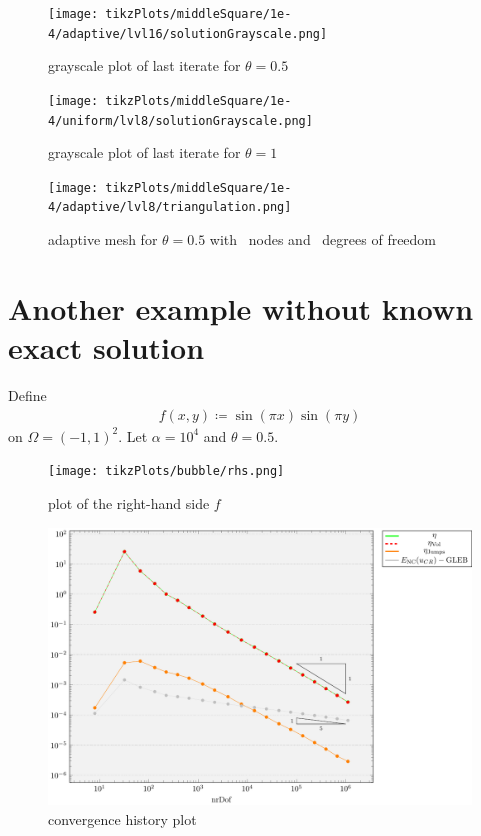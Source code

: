 \documentclass[draft=false,twoside,12pt]{scrreprt}
\begin{document}
\begin{minipage}[t]{0.5\textwidth}
  \begin{figure}[H]
	  \centering
		\texttt{[image: tikzPlots/middleSquare/1e-4/adaptive/lvl16/solutionGrayscale.png]}
    \caption{grayscale plot of last iterate for $\theta = 0.5$}
  \end{figure}
\end{minipage}
\begin{minipage}[t]{0.5\textwidth}
  \begin{figure}[H]
	  \centering
		\texttt{[image: tikzPlots/middleSquare/1e-4/uniform/lvl8/solutionGrayscale.png]}
    \caption{grayscale plot of last iterate for $\theta = 1$}
  \end{figure}
\end{minipage}


\begin{figure}[H]
	\centering
  \texttt{[image: tikzPlots/middleSquare/1e-4/adaptive/lvl8/triangulation.png]}
  \caption{adaptive mesh for $\theta = 0.5$ with \nrNodes\ nodes and 
  \nrDof\ degrees of freedom}
\end{figure}


\section{Another example without known exact solution}
Define
\begin{align}
  \label{equ:defBubble}
  f(x, y)\coloneqq \sin(\pi x)\sin(\pi y)
\end{align}
on $\Omega = (-1,1)^2$.
Let $\alpha = 10^4$ and $\theta = 0.5$.

\begin{figure}[H]
	\centering
	\texttt{[image: tikzPlots/bubble/rhs.png]}
  \caption{plot of the right-hand side $f$}
  \label{fig:rhsBubble}
\end{figure}

\begin{figure}[H]
	\centering
	\includegraphics[width=16cm]
  {tikzPlots/bubble/convergence.pdf}
  \caption{convergence history plot}
\end{figure}
\end{document}
